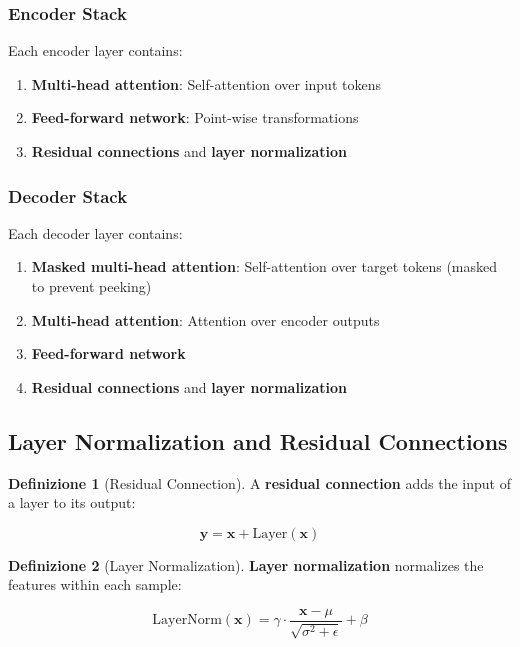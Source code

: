 \documentclass[11pt,a4paper]{article}
\theoremstyle{definition}
\newtheorem{definition}{Definizione}[section]
\theoremstyle{plain}
\theoremstyle{remark}
\begin{document}
\subsubsection{Encoder Stack}

Each encoder layer contains:
\begin{enumerate}
    \item \textbf{Multi-head attention}: Self-attention over input tokens
    \item \textbf{Feed-forward network}: Point-wise transformations
    \item \textbf{Residual connections} and \textbf{layer normalization}
\end{enumerate}

\subsubsection{Decoder Stack}

Each decoder layer contains:
\begin{enumerate}
    \item \textbf{Masked multi-head attention}: Self-attention over target tokens (masked to prevent peeking)
    \item \textbf{Multi-head attention}: Attention over encoder outputs
    \item \textbf{Feed-forward network}
    \item \textbf{Residual connections} and \textbf{layer normalization}
\end{enumerate}

\subsection{Layer Normalization and Residual Connections}

\begin{definition}[Residual Connection]
A \textbf{residual connection} adds the input of a layer to its output:

\[
\mathbf{y} = \mathbf{x} + \text{Layer}(\mathbf{x})
\]
\end{definition}

\begin{definition}[Layer Normalization]
\textbf{Layer normalization} normalizes the features within each sample:

\[
\text{LayerNorm}(\mathbf{x}) = \gamma \cdot \frac{\mathbf{x} - \mu}{\sqrt{\sigma^2 + \epsilon}} + \beta
\]
\end{definition}
\end{document}
